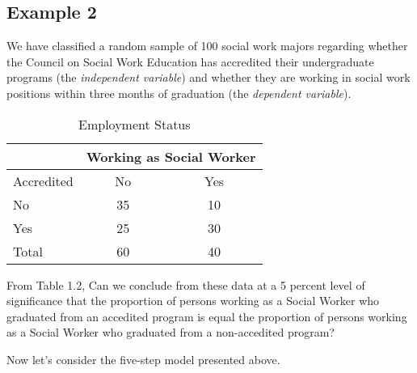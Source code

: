 \documentclass[11pt]{book}\usepackage[]{graphicx}\usepackage[]{color}
\begin{document}
\subsection{Example 2}    %

We have classified a random sample of 100 social work majors regarding whether the Council on Social Work Education has accredited their undergraduate programs (the \emph{independent variable}) and whether they are working in social work positions within three months of graduation (the \emph{dependent variable}).



\begin{table}[htbp]
   \centering
   \caption{Employment Status}
   \begin{tabular}{@{} lcc @{}} \hline %
     &  \multicolumn{2}{c}{ Working as Social Worker } \\ \hline
     Accredited   & No & Yes \\ \hline
     No           & 35 & 10 \\
     Yes          & 25 & 30 \\ \hline
     Total        & 60 & 40 \\ \hline
   \end{tabular}

   \label{tab:c10_2}
\end{table}

From Table 1.2, Can we conclude from these data at a 5 percent level of significance that the proportion of persons working as a Social Worker who graduated from an accedited program is equal the proportion of persons working as a Social Worker who graduated from a non-accedited program?

Now let's consider the five-step model presented above.
\end{document}
